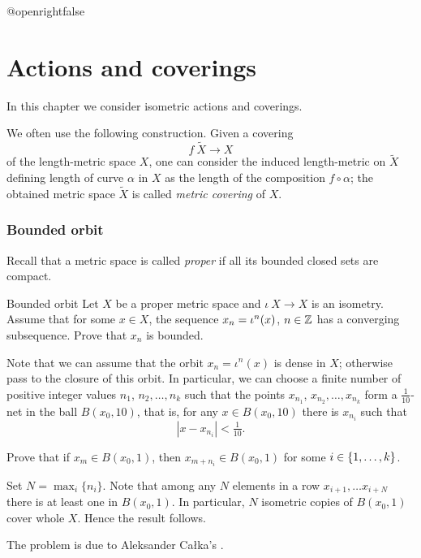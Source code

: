\csname @openrightfalse\endcsname
\chapter{Actions and coverings}

In this chapter we consider isometric actions and coverings.

We often use the following construction.
Given a covering 
\[f\:\tilde X \to X\]
of the length-metric space $X$,
one can consider the induced length-metric on $\tilde X$
defining length of curve $\alpha$ in $X$ as the length of the composition $f\circ\alpha$; the obtained metric space $\tilde X$ is called \emph{metric covering} of $X$.



\subsection*{Bounded orbit}

Recall that a metric space is called \emph{proper} if all its bounded closed sets are compact.

\begin{pr}{}{Bounded orbit}\label{Bounded orbit} Let $X$ be a 
proper metric space 
and $\iota\:X\to X$ is an isometry.
Assume that for some $x\in X$, the sequence $x_n\z=\iota^n(x)$, $n\in\mathbb{Z}$ has a converging subsequence.
Prove that $x_n$ is bounded.
\end{pr}

Note that we can assume that the orbit $x_n=\iota^n(x)$ is dense in $X$;
otherwise pass to the closure of this orbit.
In particular, we can choose a finite number of positive integer values $n_1$, $n_2,\dots,n_k$
such that the points $x_{n_1}$, $x_{n_2},\dots,x_{n_k}$ form a $\tfrac1{10}$-net in the ball $B(x_0,10)$,
that is, for any $x\in B(x_0,10)$ there is $x_{n_i}$ such that
\[|x-x_{n_i}|<\tfrac1{10}.\]

Prove that 
if $x_m\in B(x_0,1)$, 
then $x_{m+n_i}\in B(x_0,1)$ for some $i\z\in\{1,\dots,k\}$.

Set $N=\max_i\{n_i\}$.
Note that among any $N$ elements in a row $x_{i+1},\dots x_{i+N}$
there is at least one in $B(x_0,1)$.
In particular, $N$ isometric copies of $B(x_0,1)$ cover whole $X$.
Hence the result follows.\qeds

The problem is due to Aleksander Ca{\l}ka's \cite[see][]{calka}.

